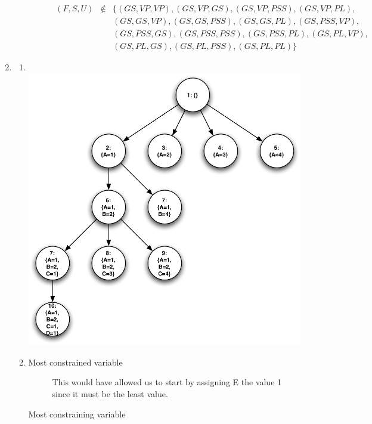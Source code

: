 \documentclass[10pt]{article}
\begin{document}
\begin{enumerate}
\begin{enumerate}
\begin{description}
\begin{eqnarray*}
        (F,S,U) & \notin & \{(GS, VP, VP), (GS, VP, GS), 
                             (GS, VP, PSS), (GS, VP, PL), \\
                &        &   (GS, GS, VP), (GS, GS, PSS), 
                             (GS, GS, PL), (GS, PSS, VP), \\
                &        &   (GS, PSS, GS), (GS, PSS, PSS), 
                             (GS, PSS, PL), (GS, PL, VP), \\
                &        &   (GS, PL, GS), (GS, PL, PSS), (GS, PL, PL)\} 
      \end{eqnarray*}
    \end{description}
  \end{enumerate}
\pagebreak
\item %
  \begin{enumerate}
  \item %
    \ \\
    \includegraphics[width=5.5in]{2a_csp_tree.pdf}
  \item %
    \begin{description}
    \item[Most constrained variable]
      This would have allowed us to start by assigning E the value 1 since
      it must be the least value.
    \item[Most constraining variable]

\end{description}
\end{enumerate}
\end{enumerate}
\end{document}

